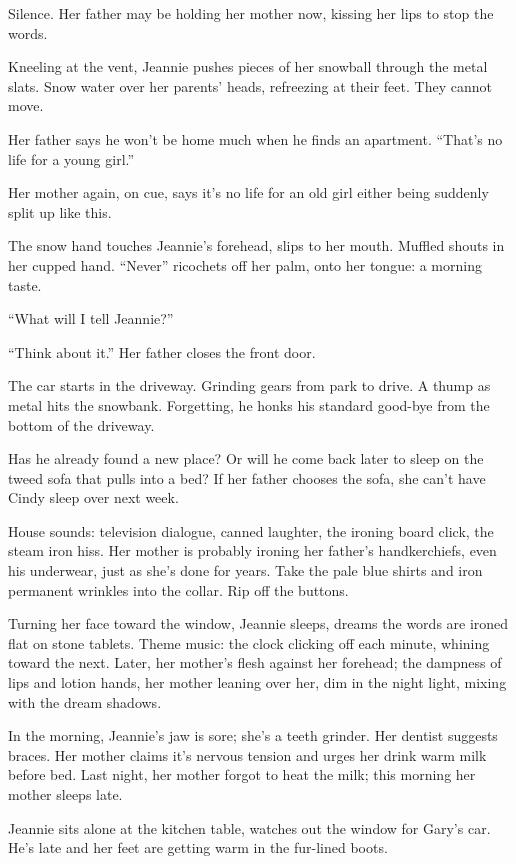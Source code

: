 \documentclass[twoside,10pt]{book}
\begin{document}
Silence. Her father may be holding her mother now, kissing her lips to
stop the words.

Kneeling at the vent, Jeannie pushes pieces of her snowball through the
metal slats. Snow water over her parents' heads, refreezing at their
feet. They cannot move.

Her father says he won't be home much when he finds an apartment.
``That's no life for a young girl.''

Her mother again, on cue, says it's no life for an old girl either being
suddenly split up like this.

The snow hand touches Jeannie's forehead, slips to her mouth. Muffled
shouts in her cupped hand. ``Never'' ricochets off her palm, onto her
tongue: a morning taste.

``What will I tell Jeannie?''

``Think about it.'' Her father closes the front door.

The car starts in the driveway. Grinding gears from park to drive. A
thump as metal hits the snowbank. Forgetting, he honks his standard
good-bye from the bottom of the driveway.

Has he already found a new place? Or will he come back later to sleep on
the tweed sofa that pulls into a bed? If her father chooses the sofa,
she can't have Cindy sleep over next week.

House sounds: television dialogue, canned laughter, the ironing board
click, the steam iron hiss. Her mother is probably ironing her father's
handkerchiefs, even his underwear, just as she's done for years. Take
the pale blue shirts and iron permanent wrinkles into the collar. Rip
off the buttons.

Turning her face toward the window, Jeannie sleeps, dreams the words are
ironed flat on stone tablets. Theme music: the clock clicking off each
minute, whining toward the next. Later, her mother's flesh against her
forehead; the dampness of lips and lotion hands, her mother leaning over
her, dim in the night light, mixing with the dream shadows.

In the morning, Jeannie's jaw is sore; she's a teeth grinder. Her
dentist suggests braces. Her mother claims it's nervous tension and
urges her drink warm milk before bed. Last night, her mother forgot to
heat the milk; this morning her mother sleeps late.

Jeannie sits alone at the kitchen table, watches out the window for
Gary's car. He's late and her feet are getting warm in the fur-lined
boots.
\end{document}
